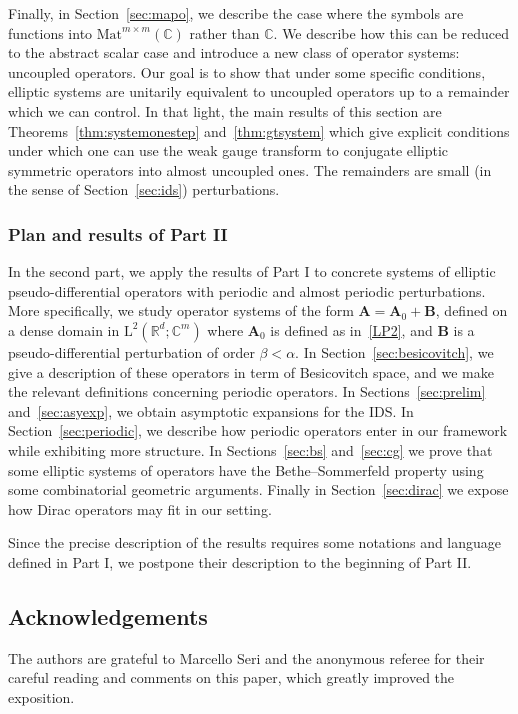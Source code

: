\documentclass[AHL,Unicode,longabstracts,published]{cedram}
\newcommand{\Mat}{\mathrm{Mat}}
\newcommand{\RL}{\mathrm{L}}
\newcommand{\R}{\mathbb R}
\newcommand{\C}{\mathbb C}
\newcommand{\BA}{\mathbf A}
\newcommand{\BB}{\mathbf B}
\begin{document}
Finally, in Section~\ref{sec:mapo}, we describe the case where the symbols are functions into $\Mat^{m\times m}(\C)$ rather than $\C$. We describe how this can be reduced to the abstract scalar case and introduce a new class of operator systems: uncoupled operators. Our goal is to show that under some specific conditions, elliptic systems are unitarily equivalent to uncoupled operators up to a remainder which we can control. In that light, the main results of this section are Theorems~\ref{thm:systemonestep} and~\ref{thm:gtsystem} which give explicit conditions under which one can use the weak gauge transform to conjugate elliptic symmetric operators into almost uncoupled ones. The remainders are small (in the sense of Section~\ref{sec:ids}) perturbations.


\subsubsection*{Plan and results of Part II}

In the second part, we apply the results of Part I to concrete systems of elliptic pseudo-differential operators with periodic and almost periodic perturbations. More specifically, we study operator systems of the form $\BA =
\BA_0 + \BB$, defined on a dense domain in $\RL^2(\R^d;\C^m)$ where $\BA_0$ is defined as in~\eqref{LP2}, and $\BB$ is a pseudo-differential perturbation of order $\beta < \alpha$. In Section~\ref{sec:besicovitch}, we give a description of these operators in term of Besicovitch space, and we make the relevant definitions concerning periodic operators. In Sections~\ref{sec:prelim} and~\ref{sec:asyexp}, we obtain asymptotic expansions for the IDS. In Section~\ref{sec:periodic}, we describe how periodic operators enter in our framework while exhibiting more structure. In Sections~\ref{sec:bs} and~\ref{sec:cg} we prove that some elliptic systems of operators have the Bethe--Sommerfeld property using some combinatorial geometric arguments. Finally in Section~\ref{sec:dirac} we expose how Dirac operators may fit in our setting.

Since the precise description of the results requires some notations and language defined in Part I, we postpone their description to the beginning of Part II.

\subsection*{Acknowledgements}
The authors are grateful to Marcello Seri and the anonymous referee for their careful reading and comments on this paper, which greatly improved the exposition. 
\end{document}
